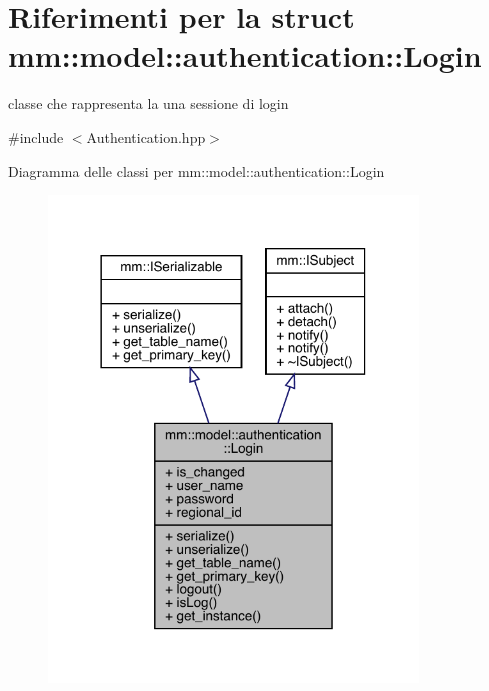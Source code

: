 \hypertarget{structmm_1_1model_1_1authentication_1_1_login}{}\section{Riferimenti per la struct mm\+:\+:model\+:\+:authentication\+:\+:Login}
\label{structmm_1_1model_1_1authentication_1_1_login}


classe che rappresenta la una sessione di login  




{\ttfamily \#include $<$Authentication.\+hpp$>$}



Diagramma delle classi per mm\+:\+:model\+:\+:authentication\+:\+:Login
\nopagebreak
\begin{figure}[H]
\begin{center}
\leavevmode
\includegraphics[width=278pt]{dc/d2d/structmm_1_1model_1_1authentication_1_1_login__inherit__graph}
\end{center}
\end{figure}


